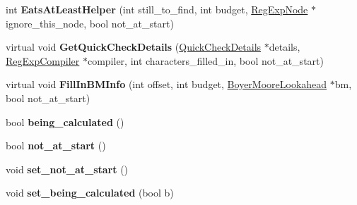 \begin{DoxyCompactItemize}
\item 
\hypertarget{classv8_1_1internal_1_1_choice_node_afcd5ff9141d54e2d163a60a66cb3abbd}{}int {\bfseries Eats\+At\+Least\+Helper} (int still\+\_\+to\+\_\+find, int budget, \hyperlink{classv8_1_1internal_1_1_reg_exp_node}{Reg\+Exp\+Node} $\ast$ignore\+\_\+this\+\_\+node, bool not\+\_\+at\+\_\+start)\label{classv8_1_1internal_1_1_choice_node_afcd5ff9141d54e2d163a60a66cb3abbd}

\item 
\hypertarget{classv8_1_1internal_1_1_choice_node_a7e49411bc661f7902bc9c8d048fbc265}{}virtual void {\bfseries Get\+Quick\+Check\+Details} (\hyperlink{classv8_1_1internal_1_1_quick_check_details}{Quick\+Check\+Details} $\ast$details, \hyperlink{classv8_1_1internal_1_1_reg_exp_compiler}{Reg\+Exp\+Compiler} $\ast$compiler, int characters\+\_\+filled\+\_\+in, bool not\+\_\+at\+\_\+start)\label{classv8_1_1internal_1_1_choice_node_a7e49411bc661f7902bc9c8d048fbc265}

\item 
\hypertarget{classv8_1_1internal_1_1_choice_node_a7b08dcfb510c57af423f70c5a175885f}{}virtual void {\bfseries Fill\+In\+B\+M\+Info} (int offset, int budget, \hyperlink{classv8_1_1internal_1_1_boyer_moore_lookahead}{Boyer\+Moore\+Lookahead} $\ast$bm, bool not\+\_\+at\+\_\+start)\label{classv8_1_1internal_1_1_choice_node_a7b08dcfb510c57af423f70c5a175885f}

\item 
\hypertarget{classv8_1_1internal_1_1_choice_node_a424ff01754676f5bac9b7e5356332dc3}{}bool {\bfseries being\+\_\+calculated} ()\label{classv8_1_1internal_1_1_choice_node_a424ff01754676f5bac9b7e5356332dc3}

\item 
\hypertarget{classv8_1_1internal_1_1_choice_node_ac196fd8c0df4d1676a23fed33ad460c6}{}bool {\bfseries not\+\_\+at\+\_\+start} ()\label{classv8_1_1internal_1_1_choice_node_ac196fd8c0df4d1676a23fed33ad460c6}

\item 
\hypertarget{classv8_1_1internal_1_1_choice_node_a43edce21f575aebdb5417794138043be}{}void {\bfseries set\+\_\+not\+\_\+at\+\_\+start} ()\label{classv8_1_1internal_1_1_choice_node_a43edce21f575aebdb5417794138043be}

\item 
\hypertarget{classv8_1_1internal_1_1_choice_node_a756fc92efb374945d6584a8f68ba9e1f}{}void {\bfseries set\+\_\+being\+\_\+calculated} (bool b)\label{classv8_1_1internal_1_1_choice_node_a756fc92efb374945d6584a8f68ba9e1f}


\end{DoxyCompactItemize}

